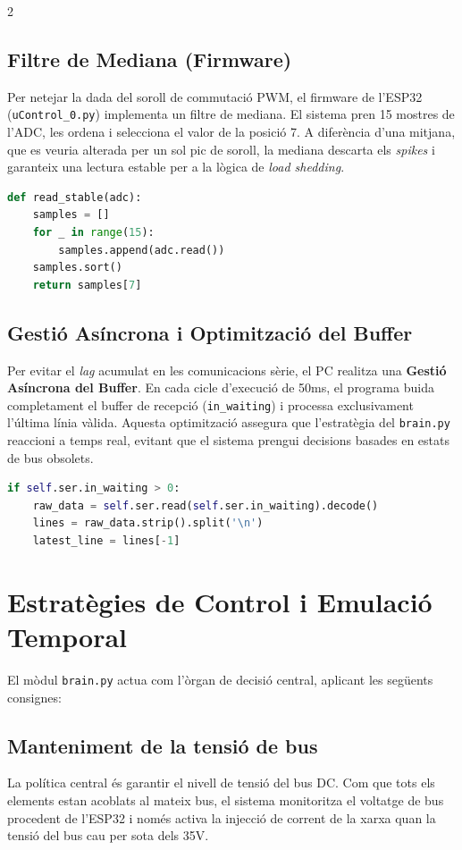 \documentclass[11pt,a4paper]{article}
\begin{document}
\begin{multicols}{2}
    \subsection{Filtre de Mediana (Firmware)}
    Per netejar la dada del soroll de commutació PWM, el firmware de l'ESP32 (\texttt{uControl\_0.py}) implementa un filtre de mediana. El sistema pren 15 mostres de l'ADC, les ordena i selecciona el valor de la posició 7. A diferència d'una mitjana, que es veuria alterada per un sol pic de soroll, la mediana descarta els \textit{spikes} i garanteix una lectura estable per a la lògica de \textit{load shedding}.

    \begin{lstlisting}[language=Python]
def read_stable(adc):
    samples = []
    for _ in range(15):
        samples.append(adc.read())
    samples.sort()
    return samples[7] 
\end{lstlisting}

    \subsection{Gestió Asíncrona i Optimització del Buffer}
    Per evitar el \textit{lag} acumulat en les comunicacions sèrie, el PC realitza una \textbf{Gestió Asíncrona del Buffer}. En cada cicle d'execució de 50ms, el programa buida completament el buffer de recepció (\texttt{in\_waiting}) i processa exclusivament l'última línia vàlida. Aquesta optimització assegura que l'estratègia del \texttt{brain.py} reaccioni a temps real, evitant que el sistema prengui decisions basades en estats de bus obsolets.

    \begin{lstlisting}[language=Python]
if self.ser.in_waiting > 0:
    raw_data = self.ser.read(self.ser.in_waiting).decode()
    lines = raw_data.strip().split('\n')
    latest_line = lines[-1] 
\end{lstlisting}

    \section{Estratègies de Control i Emulació Temporal}
    El mòdul \texttt{brain.py} actua com l'òrgan de decisió central, aplicant les següents consignes:

    \subsection{Manteniment de la tensió de bus}
    La política central és garantir el nivell de tensió del bus DC. Com que tots els elements estan acoblats al mateix bus, el sistema monitoritza el voltatge de bus procedent de l'ESP32 i només activa la injecció de corrent de la xarxa quan la tensió del bus cau per sota dels 35V.


\end{multicols}
\end{document}

